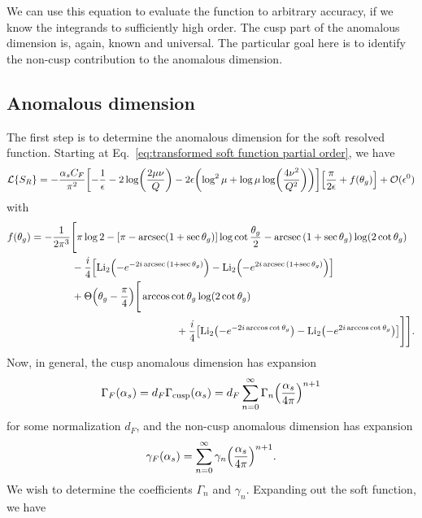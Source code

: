 \documentclass[11pt,twoside,reqno]{amsart}
\theoremstyle{plain}
\theoremstyle{remark}
\theoremstyle{definition}
\theoremstyle{remark}
\theoremstyle{definition}
\theoremstyle{definition}
\newcommand{\cL}{\mathcal{L}}
\newcommand{\cO}{\mathcal{O}}
\newcommand{\Li}{\mathrm{Li}}
\newcommand{\cusp}{\mathrm{cusp}}
\begin{document}
	We can use this equation to evaluate the function to arbitrary accuracy, if we know the integrands to sufficiently high order. The cusp part of the anomalous dimension is, again, known and universal. The particular goal here is to identify the non-cusp contribution to the anomalous dimension.

\subsection{Anomalous dimension}
	The first step is to determine the anomalous dimension for the soft resolved function. Starting at Eq.~\ref{eq:transformed soft function partial order}, we have
	\begin{equation}
		\cL\qty{S_R} = -\frac{\alpha_s C_F}{\pi^2}\qty[-\frac{1}{\epsilon} - 2\log(\frac{2\mu\nu}{Q}) - 2\epsilon\qty(\log^2\mu + \log\mu \log(\frac{4\nu^2}{Q^2}))]\qty[\frac{\pi}{2\epsilon} + f(\theta_g)] + \cO(\epsilon^0)
	\end{equation}
	with
	\begin{equation}\label{eq:non-cusp f function}
	\begin{aligned}
		f(\theta_g) &= -\frac{1}{2\pi^3}\Bigg[\pi \log 2 - \qty[\pi - \arcsec(1 + \sec\theta_g)]\log\cot\frac{\theta_g}{2} - \arcsec\qty(1 + \sec\theta_g) \log(2\cot\theta_g) \\
			&\qquad\qquad - \frac{i}{4}\qty[\Li_2\qty(-e^{-2i\arcsec\qty(1 + \sec\theta_g)}) - \Li_2\qty(-e^{2i\arcsec\qty(1 + \sec\theta_g)})] \\
			&\qquad\qquad+ \Theta\qty(\theta_g - \frac{\pi}{4})\Bigg[ \arccos\cot\theta_g \log(2\cot\theta_g) \\
			&\hspace{5cm}+ \frac{i}{4}\qty[\Li_2\qty(-e^{-2i\arccos\cot\theta_g}) - \Li_2\qty(-e^{2i\arccos\cot\theta_g})] \Bigg]\Bigg].
	\end{aligned}
	\end{equation}
	Now, in general, the cusp anomalous dimension has expansion \cite{frye_factorization_2016}
	\begin{equation}
		\Gamma_{F}(\alpha_s) = d_F\Gamma_\cusp(\alpha_s) = d_F\sum_{n = 0}^\infty \Gamma_n \qty(\frac{\alpha_s}{4\pi})^{n+1}
	\end{equation}
	for some normalization $d_F$, and the non-cusp anomalous dimension has expansion
	\begin{equation}
		\gamma_F(\alpha_s) = \sum_{n = 0}^\infty \gamma_n \qty(\frac{\alpha_s}{4\pi})^{n+1}.
	\end{equation}
	We wish to determine the coefficients $\Gamma_n$ and $\gamma_n$. Expanding out the soft function, we have
\end{document}
